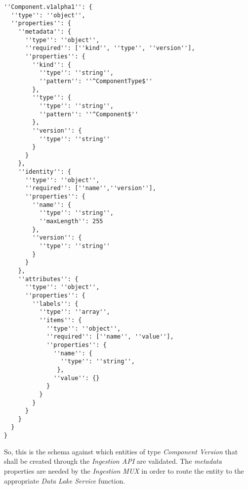 \begin{lstlisting}[basicstyle=\tiny, caption=Component Version Schema, captionpos=b, label=lst:ComponentVersionSchema]
''Component.v1alpha1'': {
  ''type'': ''object'',
  ''properties'': {
    ''metadata'': {
      ''type'': ''object'',
      ''required'': [''kind'', ''type'', ''version''],
      ''properties'': {
      	''kind'': {
      	  ''type'': ''string'',
      	  ''pattern'': ''^ComponentType$''
      	},
        ''type'': {
          ''type'': ''string'',
          ''pattern'': ''^Component$''
        },
        ''version'': {
          ''type'': ''string''
        }
      }
    },
    ''identity'': {
      ''type'': ''object'',
      ''required'': [''name'',''version''],
      ''properties'': {
        ''name'': {
          ''type'': ''string'',
          ''maxLength'': 255
        },
        ''version'': {
          ''type'': ''string''
        }
      }
    },
    ''attributes'': {
      ''type'': ''object'',
      ''properties'': {
        ''labels'': {
          ''type'': ''array'',
          ''items'': {
            ''type'': ''object'',
            ''required'': [''name'', ''value''],
            ''properties'': {
              ''name'': {
                ''type'': ''string'',
               },
              ''value'': {}
            }
          }  
        } 
      }
    }
  }
}
\end{lstlisting}

So, this is the schema against which entities of type \emph{Component Version} that shall be created through the \emph{Ingestion API} are validated. The \emph{metadata} properties are needed by the \emph{Ingestion MUX} in order to route the entity to the appropriate \emph{Data Lake Service} function.\\

